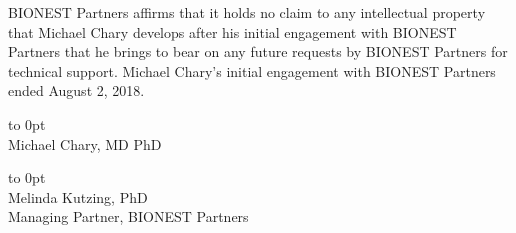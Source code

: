 \documentclass[a4paper,11pt]{texMemo}
\begin{document}
   BIONEST Partners affirms that it holds no claim to any intellectual property that Michael Chary develops after his initial engagement with BIONEST Partners that he brings to bear on any future requests by BIONEST Partners for technical support. Michael Chary's initial engagement with BIONEST Partners ended August 2, 2018. 

\vspace{3\baselineskip}%
\hrulefill
\hspace*{0mm}\vbox to 0pt{\uline{\hspace{.5\linewidth}}\\[3pt]
\phantom{thi} Michael Chary, MD PhD}%

\vspace{3\baselineskip}%
\hrulefill
\hspace*{0mm}\vbox to 0pt{\uline{\hspace{.5\linewidth}}\\[3pt]
\phantom{thi} Melinda Kutzing, PhD\\
\phantom{thi} Managing Partner, BIONEST Partners}%
\end{document}
